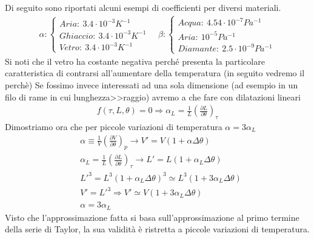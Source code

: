 \documentclass[
10pt, %
a4paper, %
oneside, %
headinclude,footinclude, %
BCOR5mm, %
]{scrartcl}
\begin{document}
Di seguito sono riportati alcuni esempi di coefficienti per diversi materiali. 
\begin{align*} 
	\alpha:\begin{cases}
		Aria:\ 3.4\cdot10^{-3} K^{-1}\\
		Ghiaccio:\ 3.4\cdot10^{-3} K^{-1}\\
		Vetro:\ 3.4\cdot10^{-3} K^{-1}
	\end{cases} \quad
	\beta:\begin{cases}
		Acqua:\ 4.54\cdot 10^{-7} Pa^{-1}\\
		Aria:\ 10^{-5} Pa^{-1}\\
		Diamante:\ 2.5 \cdot 10^{-9} Pa^{-1}
	\end{cases}
\end{align*} 
Si noti che il vetro ha costante negativa perché presenta la particolare caratteristica di contrarsi all'aumentare della temperatura (in seguito vedremo il perchè)
Se fossimo invece interessati ad una sola dimensione (ad esempio in un filo di rame in cui lunghezza>>raggio) avremo a che fare con dilatazioni lineari
\begin{align*} 
	f(\tau, L, \theta) = 0 \Rightarrow \alpha_L = \frac{1}{L}(\frac{\partial L}{\partial \theta})_{\tau}
\end{align*} 
Dimostriamo ora che per piccole variazioni di temperatura $\alpha = 3\alpha_L$
\begin{align*} 
	&\alpha \equiv \frac{1}{V} (\frac{\partial V}{\partial \theta})_p \rightarrow V' = V(1 + \alpha \Delta \theta)\\
	&\alpha_L = \frac{1}{L}(\frac{\partial L}{\partial \theta})_{\tau} \rightarrow L' = L(1 + \alpha_L \Delta \theta)\\
	&L'^{3} = L^3 (1 + \alpha_L \Delta \theta)^3 \simeq L^3 (1+3\alpha_L \Delta \theta)\\
	&V' = L'^3 \Rightarrow V' \simeq V (1 + 3 \alpha_L \Delta \theta)\\
	&\alpha = 3\alpha_L
\end{align*} 
Visto che l'approssimazione fatta si basa sull'approssimazione al primo termine della serie di Taylor, la sua validità è ristretta a piccole variazioni di temperatura.\\
\end{document}
